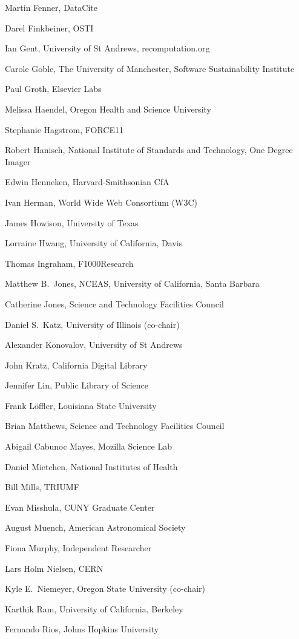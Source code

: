 \documentclass[12pt, oneside]{amsart}
\begin{document}
Martin Fenner, DataCite

Darel Finkbeiner, OSTI

Ian Gent, University of St Andrews, recomputation.org

Carole Goble, The University of Manchester, Software Sustainability Institute

Paul Groth, Elsevier Labs

Melissa Haendel, Oregon Health and Science University

Stephanie Hagstrom, FORCE11

Robert Hanisch, National Institute of Standards and Technology, One Degree Imager

Edwin Henneken, Harvard-Smithsonian CfA

Ivan Herman, World Wide Web Consortium (W3C)

James Howison, University of Texas

Lorraine Hwang, University of California,  Davis

Thomas Ingraham, F1000Research

Matthew B.~Jones, NCEAS, University of California,  Santa Barbara

Catherine Jones, Science and Technology Facilities Council

Daniel S.~Katz, University of Illinois (co-chair)

Alexander Konovalov, University of St Andrews

John Kratz, California Digital Library

Jennifer Lin, Public Library of Science

Frank L\"offler, Louisiana State University

Brian Matthews, Science and Technology Facilities Council

Abigail Cabunoc Mayes, Mozilla Science Lab

Daniel Mietchen, National Institutes of Health

Bill Mills, TRIUMF

Evan Misshula, CUNY Graduate Center

August Muench, American Astronomical Society

Fiona Murphy, Independent Researcher

Lars Holm Nielsen, CERN

Kyle E.~Niemeyer, Oregon State University (co-chair)

Karthik Ram, University of California, Berkeley

Fernando Rios, Johns Hopkins University
\end{document}
